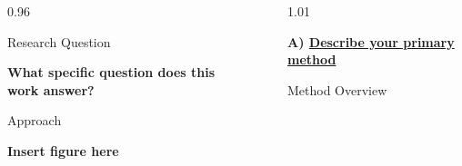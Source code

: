 \documentclass[final]{beamer}
\newlength{\sepwidth}
\newlength{\colwidth}
\newcommand{\separatorcolumn}{%
    \begin{column}{\sepwidth}
    \end{column}
}
\begin{document}
\begin{frame}[t]
\begin{columns}[t]
\begin{column}{0.96\colwidth}

\begin{alertblock}{Research Question}

\begin{center}

\textbf{
    What specific question does this work answer?
}

\end{center}

\end{alertblock}



\begin{block}{Approach}

\begin{center}

%

\vspace{2cm}

\textbf{Insert figure here}

\vspace{2cm}

\end{center}

\end{block}


\end{column}



\separatorcolumn

\begin{column}{1.01\colwidth}



\textcolor{ucsdblue}{
    \textbf{
        A) \underline{Describe your primary method}
    }
}


\vspace{0.5cm}


\begin{block}{Method Overview}


\end{block}
\end{column}
\end{columns}
\end{frame}
\end{document}
